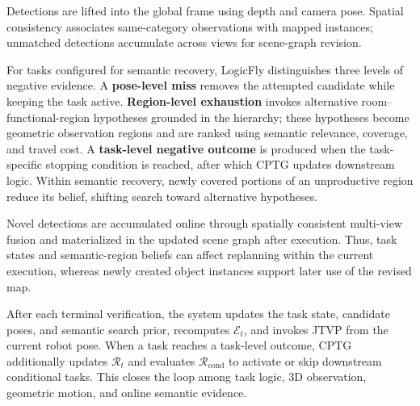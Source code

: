 \documentclass[letterpaper,10pt,conference]{ieeeconf}
\begin{document}
Detections are lifted into the global frame using depth and camera pose. Spatial consistency associates same-category observations with mapped instances; unmatched detections accumulate across views for scene-graph revision.

For tasks configured for semantic recovery, LogicFly distinguishes three levels of negative evidence. A \textbf{pose-level miss} removes the attempted candidate while keeping the task active. \textbf{Region-level exhaustion} invokes alternative room--functional-region hypotheses grounded in the hierarchy; these hypotheses become geometric observation regions and are ranked using semantic relevance, coverage, and travel cost. A \textbf{task-level negative outcome} is produced when the task-specific stopping condition is reached, after which CPTG updates downstream logic. Within semantic recovery, newly covered portions of an unproductive region reduce its belief, shifting search toward alternative hypotheses.

Novel detections are accumulated online through spatially consistent multi-view fusion and materialized in the updated scene graph after execution. Thus, task states and semantic-region beliefs can affect replanning within the current execution, whereas newly created object instances support later use of the revised map.

After each terminal verification, the system updates the task state, candidate poses, and semantic search prior, recomputes $\mathcal E_t$, and invokes JTVP from the current robot pose. When a task reaches a task-level outcome, CPTG additionally updates $\mathcal R_t$ and evaluates $\mathcal R_{\mathrm{cond}}$ to activate or skip downstream conditional tasks. This closes the loop among task logic, 3D observation, geometric motion, and online semantic evidence.
\end{document}
